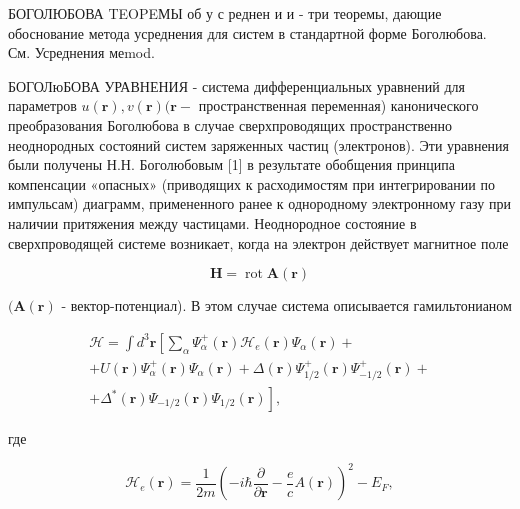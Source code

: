 \documentclass[10pt]{article}
\begin{document}
БОГОЛЮБОВА TEOPEМЫ об у с реднен и и - три теоремы, дающие обоснование метода усреднения для систем в стандартной форме Боголюбова. См. Усреднения меmod.



БОГОЛюБОВА УРАВНЕНИЯ - система дифференциальных уравнений для параметров $u(\boldsymbol{r}), v(\boldsymbol{r})(\boldsymbol{r}-$ пространственная переменная) канонического преобразования Боголюбова в случае сверхпроводящих пространственно неоднородных состояний систем заряженных частиц (электронов). Эти уравнения были получены Н.Н. Боголюбовым [1] в результате обобщения принципа компенсации «опасных» (приводящих к расходимостям при интегрировании по импульсам) диаграмм, примененного ранее к однородному электронному газу при наличии притяжения между частицами. Неоднородное состояние в сверхпроводящей системе возникает, когда на электрон действует магнитное поле



\[

\boldsymbol{H}=\operatorname{rot} \boldsymbol{A}(\boldsymbol{r})

\]



$(\boldsymbol{A}(\boldsymbol{r})$ - вектор-потенциал). В этом случае система описывается гамильтонианом



\[

\begin{gathered}

\mathscr{H}=\int d^{3} \boldsymbol{r}\left[\sum_{\alpha} \Psi_{\alpha}^{+}(\boldsymbol{r}) \mathscr{H}_{e}(\boldsymbol{r}) \Psi_{\alpha}(\boldsymbol{r})+\right. \\

+U(\boldsymbol{r}) \Psi_{\alpha}^{+}(\boldsymbol{r}) \Psi_{\alpha}(\boldsymbol{r})+\Delta(\boldsymbol{r}) \Psi_{1 / 2}^{+}(\boldsymbol{r}) \Psi_{-1 / 2}^{+}(\boldsymbol{r})+ \\

\left.+\Delta^{*}(\boldsymbol{r}) \Psi_{-1 / 2}(\boldsymbol{r}) \Psi_{1 / 2}(\boldsymbol{r})\right],

\end{gathered}

\]



где



\[

\mathscr{H}_{e}(\boldsymbol{r})=\frac{1}{2 m}\left(-i \hbar \frac{\partial}{\partial \boldsymbol{r}}-\frac{e}{c} A(\boldsymbol{r})\right)^{2}-E_{F},

\]
\end{document}
